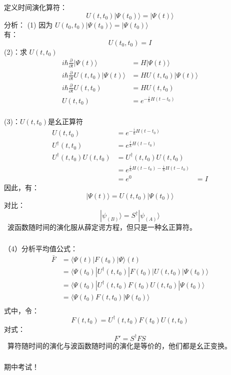 \begin{frame}  
    \frametitle{}  
    定义时间演化算符：
    $$ U(t,t_0) |\Psi(t_0)\rangle = |\Psi(t)\rangle  $$
    \alert{分析}：
    (1) 因为 $ U(t_0,t_0) |\Psi(t_0)\rangle = |\Psi(t_0)\rangle  $ \\
     有：$$ U(t_0,t_0)=I $$
    (2)：求 $ U(t,t_0)$
    $$ \begin{aligned}
        i\hbar \frac{\partial }{\partial t} |\Psi(t)\rangle &= H|\Psi(t)\rangle  \\
        i\hbar \frac{\partial }{\partial t}  U(t,t_0) |\Psi(t)\rangle &= H U(t,t_0) |\Psi(t)\rangle  \\
        i\hbar \frac{\partial }{\partial t}  U(t,t_0)  &= H U(t,t_0)  \\
        U(t,t_0)  &= e^{-\frac{i}{\hbar} H(t-t_0)}  \\
    \end{aligned} $$
\end{frame} 

\begin{frame}  
    (3)：$ U(t,t_0)$是幺正算符
    $$ \begin{aligned}
        U(t,t_0)  &= e^{-\frac{i}{\hbar} H(t-t_0)}  \\
        U^\dagger (t,t_0)  &= e^{\frac{i}{\hbar} H(t-t_0)}  \\
        U^\dagger (t,t_0)U(t,t_0) &= U^\dagger (t,t_0)U(t,t_0) \\
         &=e^{\frac{i}{\hbar} H(t-t_0)-\frac{i}{\hbar} H(t-t_0)} \\
         &=e^0
         &=I
    \end{aligned} $$
    因此，有：
    $$ |\Psi(t)\rangle = U(t,t_0) |\Psi(t_0)\rangle   $$
    对比： 
    $$ |\psi_{(B)}\rangle = S^\dagger |\psi_{(A)}\rangle $$
    \Note ~波函数随时间的演化服从薛定谔方程，但只是一种幺正算符。
\end{frame} 

\begin{frame}  
    \frametitle{} 
    （4）分析平均值公式：
    $$ \begin{aligned}
        \bar{F} &= \langle \Psi(t) |F(t_0) | \Psi \rangle(t)  \\
        &= \langle \Psi(t_0) |U^\dagger (t,t_0) |F(t_0) | U(t,t_0) |\Psi(t_0)\rangle   \\
        &= \langle \Psi(t_0) |U^\dagger (t,t_0) F(t_0) U(t,t_0) |\Psi(t_0)\rangle   \\
        &= \langle \Psi(t_0) F(t,t_0) |\Psi(t_0)\rangle   \\
    \end{aligned} $$
     式中，令： $$ F(t,t_0) =U^\dagger (t,t_0) F(t_0) U(t,t_0)$$
     对式：
     $$F'=S^\dagger F S $$
     \Note ~算符随时间的演化与波函数随时间的演化是等价的，他们都是幺正变换。
\end{frame} 

\begin{frame}
    \frametitle{}  
    \centering
    \LARGE \color{red} 期中考试！ \\
\end{frame}